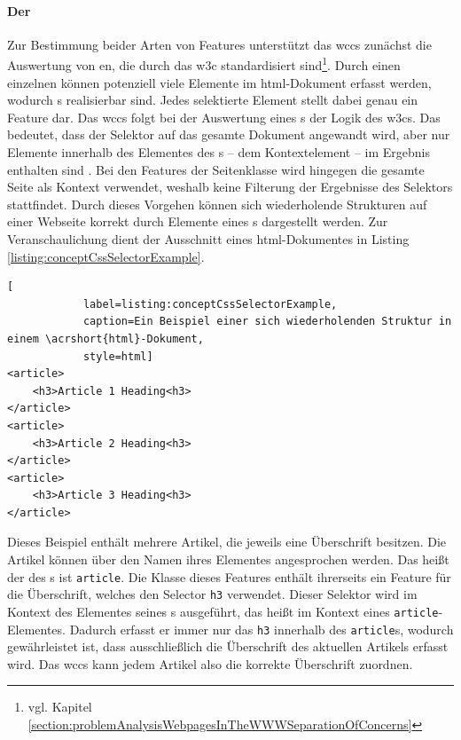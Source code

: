         \paragraph{Der \cssSelector}
        Zur Bestimmung beider Arten von Features unterstützt das \gls{wccs} zunächst
        die Auswertung von {\cssSelector}en, die durch das \gls{w3c} standardisiert
        sind\footnote{vgl. Kapitel \ref{section:problemAnalysisWebpagesInTheWWWSeparationOfConcerns}}.
        Durch einen einzelnen {\cssSelector} können potenziell viele Elemente im \gls{html}-Dokument
        erfasst werden, wodurch {\collectionFeature}s realisierbar sind.
        Jedes selektierte Element stellt dabei genau ein Feature dar.
        Das \gls{wccs} folgt bei der Auswertung eines {\cssSelector}s der Logik des \glspl{w3c}.
        Das bedeutet, dass der Selektor auf das gesamte Dokument angewandt wird,
        aber nur Elemente innerhalb des Elementes des {\parentFeature}s -- dem Kontextelement --
        im Ergebnis enthalten sind \cite{w3c:selectorsAPI}.
        Bei den Features der Seitenklasse wird hingegen die gesamte Seite als Kontext verwendet,
        weshalb keine Filterung der Ergebnisse des Selektors stattfindet.
        Durch dieses Vorgehen können sich wiederholende Strukturen auf einer Webseite
        korrekt durch Elemente eines {\collectionFeature}s dargestellt werden.
        Zur Veranschaulichung dient der Ausschnitt eines \gls{html}-Dokumentes
        in Listing \ref{listing:conceptCssSelectorExample}.

        \begin{lstlisting}[
            label=listing:conceptCssSelectorExample,
            caption=Ein Beispiel einer sich wiederholenden Struktur in einem \acrshort{html}-Dokument,
            style=html]
<article>
    <h3>Article 1 Heading<h3>
</article>
<article>
    <h3>Article 2 Heading<h3>
</article>
<article>
    <h3>Article 3 Heading<h3>
</article>
        \end{lstlisting}

        Dieses Beispiel enthält mehrere Artikel, die jeweils eine Überschrift besitzen.
        Die Artikel können über den Namen ihres Elementes angesprochen werden.
        Das heißt der {\cssSelector} des {\collectionFeature}s ist \texttt{article}.
        Die Klasse dieses Features enthält ihrerseits ein Feature für die Überschrift,
        welches den Selector \texttt{h3} verwendet.
        Dieser Selektor wird im Kontext des Elementes seines {\parentFeature}s ausgeführt,
        das heißt im Kontext eines \texttt{article}-Elementes.
        Dadurch erfasst er immer nur das \texttt{h3} innerhalb des \texttt{article}s,
        wodurch gewährleistet ist, dass ausschließlich die Überschrift des aktuellen Artikels erfasst wird.
        Das \gls{wccs} kann jedem Artikel also die korrekte Überschrift zuordnen.

